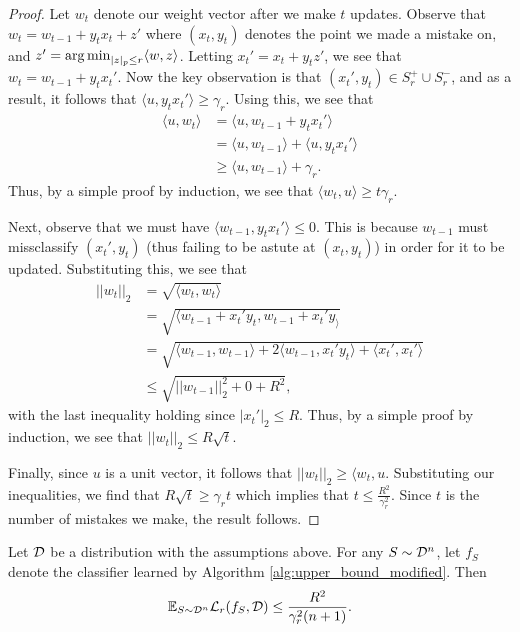 \begin{proof}
Let $w_t$ denote our weight vector after we make $t$ updates. Observe that $w_t = w_{t-1} + y_tx_t + z'$ where $(x_t, y_t)$ denotes the point we made a mistake on, and $z' = \operatorname*{arg\,min}_{|z|_p \leq r} \langle w, z \rangle$. Letting $x_t' = x_t + y_tz'$, we see that $w_t = w_{t-1} + y_tx_t'$. Now the key observation is that $(x_t', y_t) \in S_r^+ \cup S_r^-$, and as a result, it follows that $\langle u, y_tx_t' \rangle \geq \gamma_r$. Using this, we see that
\begin{equation*}
\begin{split}
\langle u, w_t \rangle &= \langle u, w_{t-1} + y_tx_t' \rangle \\
&= \langle u, w_{t-1} \rangle + \langle u, y_tx_t' \rangle \\
&\geq \langle u, w_{t-1} \rangle + \gamma_r.
\end{split}
\end{equation*}
Thus, by a simple proof by induction, we see that $\langle w_t, u \rangle \geq t\gamma_r$. 

Next, observe that we must have $\langle w_{t-1}, y_tx_t' \rangle \leq 0$. This is because $w_{t-1}$ must missclassify $(x_t', y_t)$ (thus failing to be astute at $(x_t, y_t)$) in order for it to be updated. Substituting this, we see that
\begin{equation*}
\begin{split}
||w_t||_2 &= \sqrt{\langle w_t, w_t \rangle} \\
&= \sqrt{\langle w_{t-1} + x_t'y_t, w_{t-1} + x_t'y_ \rangle} \\
&= \sqrt{\langle w_{t-1}, w_{t-1} \rangle + 2\langle w_{t-1}, x_t'y_t \rangle + \langle x_t', x_t' \rangle} \\
&\leq \sqrt{||w_{t-1}||_2^2 +  0 + R^2},
\end{split}
\end{equation*}
with the last inequality holding since $|x_t'|_2 \leq R$. Thus, by a simple proof by induction, we see that $||w_t||_2 \leq R\sqrt{t}$. 

Finally, since $u$ is a unit vector, it follows that $||w_t||_2 \geq \langle w_t, u$. Substituting our inequalities, we find that $R\sqrt{t} \geq \gamma_r t$ which implies that $t \leq \frac{R^2}{\gamma_r^2}$. Since $t$ is the number of mistakes we make, the result follows. 
\end{proof}

\begin{lem}\label{thm:upper_bound_origin}
Let ${\mathcal D}$ be a distribution with the assumptions above. For any $S \sim {\mathcal D}^n$, let $f_S$ denote the classifier learned by Algorithm \ref{alg:upper_bound_modified}. Then $${\mathbb E}_{S \sim {\mathcal D}^n}\mathcal L_r(f_S, {\mathcal D}) \leq \frac{R^2}{\gamma_r^2 (n+1)}.$$
\end{lem}

